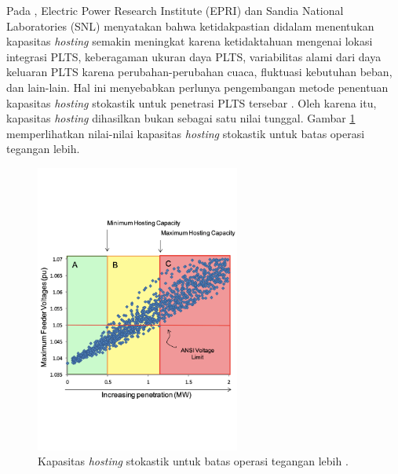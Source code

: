 {{Pada \cite{Palmintier2016}, Electric Power Research Institute (EPRI) dan Sandia National Laboratories (SNL) menyatakan bahwa ketidakpastian didalam menentukan kapasitas \textit{hosting} semakin meningkat karena ketidaktahuan mengenai lokasi integrasi PLTS, keberagaman ukuran daya PLTS, variabilitas alami dari daya keluaran PLTS karena perubahan-perubahan cuaca, fluktuasi kebutuhan beban, dan lain-lain. Hal ini menyebabkan perlunya pengembangan metode penentuan kapasitas \textit{hosting} stokastik untuk penetrasi PLTS tersebar \cite{Epri2012,Epri2013}. Oleh karena itu, kapasitas \textit{hosting} dihasilkan bukan sebagai satu nilai tunggal. Gambar \ref{phcepri} memperlihatkan nilai-nilai kapasitas \textit{hosting} stokastik untuk batas operasi tegangan lebih.
\begin{figure}[!h]
	\vspace*{-15pt}
	\centering
	\includegraphics[width=0.6\textwidth]{Fig/phcepri}
	\caption{Kapasitas \textit{hosting} stokastik untuk batas operasi tegangan lebih \cite{Epri2013}.}
	\label{phcepri}
\end{figure}

}}
